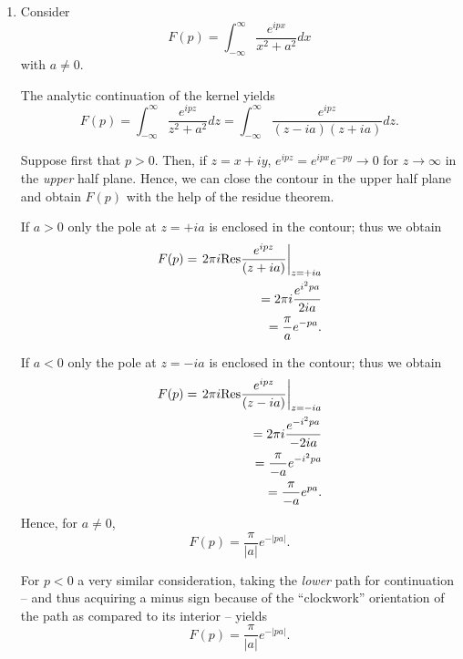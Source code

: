{\begin{enumerate}
\item  Consider   $$F(p)=\int_{-\infty}^{\infty}\frac{ e^{ipx}}{x^2+a^2} dx$$ with $a\neq 0$.

The analytic continuation of the kernel yields
$$F(p)=\int_{-\infty}^{\infty}\frac{ e^{ipz}}{z^2+a^2} dz
=  \int_{-\infty}^{\infty}\frac{ e^{ipz}}{(z-ia)(z+ia)} dz
.$$

Suppose first that $p>0$. Then, if $z=x+iy$,  $e^{ipz}=e^{ipx}e^{-py}\rightarrow 0$
for $z \rightarrow \infty $
in the {\em upper} half plane.
Hence,  we can close the contour in the upper half plane and obtain  $F(p)$
with the help of the residue theorem.

If $a>0$ only the pole at $z=+ia$ is enclosed in the contour; thus we obtain
\begin{equation}
\begin{split}
F(p) =\left.  2\pi i  {\rm Res} \frac{ e^{ipz}}{(z+ia)} \right|_{z=+ia} \\
       =  2\pi i   \frac{e^{i^2 pa}}{2ia} \\
      =  \frac{\pi}{a}    e^{- pa}.
\end{split}
\end{equation}

If $a<0$ only the pole at $z=-ia$ is enclosed in the contour; thus we obtain
\begin{equation}
\begin{split}
F(p) =\left.  2\pi i  {\rm Res} \frac{ e^{ipz}}{(z-ia)} \right|_{z=-ia} \\
       =  2\pi i   \frac{e^{-i^2 pa}}{-2ia} \\
       =  \frac{\pi}{-a}    e^{-i^2 pa} \\
       =  \frac{\pi}{-a}    e^{ pa}
.
\end{split}
\end{equation}
Hence, for $a\neq 0$,
\begin{equation}
F(p) =  \frac{\pi}{\vert a\vert }    e^{ -\vert p a\vert}.
\end{equation}

For $p<0$ a very similar consideration, taking the {\em lower} path for continuation --
and thus acquiring a minus sign because of the ``clockwork''
orientation of the path as compared to its interior --
yields
\begin{equation}
F(p) =  \frac{\pi}{\vert a\vert }    e^{  - \vert pa\vert }.
\end{equation}



\end{enumerate}}

